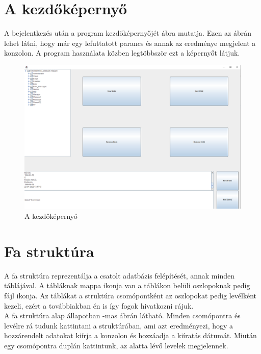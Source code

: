 \section{A kezdőképernyő}	A bejelentkezés után a program kezdőképernyőjét  ábra mutatja. Ezen az ábrán lehet látni, hogy már egy lefuttatott parancs és annak az eredménye megjelent a konzolon. A program használata közben legtöbbször ezt a képernyőt látjuk.

\begin{figure} [H]
	\centering
	\includegraphics[width=.9\textwidth]{images/opening_screen.png}
	\caption{A kezdőképernyő}
	\label{fig:program}
\end{figure}

\section{Fa struktúra} A fa struktúra reprezentálja a csatolt adatbázis felépítését, annak minden táblájával. A tábláknak mappa ikonja van a táblákon belüli oszlopoknak pedig fájl ikonja. Az táblákat a struktúra csomópontként az oszlopokat pedig levélként kezeli, ezért a továbbiakban én is így fogok hivatkozni rájuk.\\

A fa struktúra alap állapotban -mas ábrán látható. Minden csomópontra és levélre rá tudunk kattintani a struktúrában, ami azt eredményezi, hogy a hozzárendelt adatokat kiírja a konzolon és hozzáadja a kiíratás dátumát. Miután egy csomópontra duplán kattintunk, az alatta lévő levelek megjelennek.


